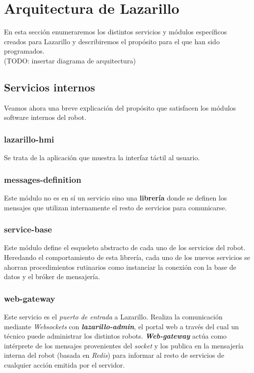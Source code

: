 \section{Arquitectura de Lazarillo}

En esta sección enumeraremos los distintos servicios y módulos específicos creados para Lazarillo y describiremos el propósito para el que han sido programados.\\

(TODO: insertar diagrama de arquitectura)

\subsection{Servicios internos}

Veamos ahora una breve explicación del propósito que satisfacen los módulos software internos del robot.

\subsubsection{lazarillo-hmi}

Se trata de la aplicación que muestra la interfaz táctil al usuario.

\subsubsection{messages-definition}

Este módulo no es en sí un servicio sino una \textbf{librería} donde se definen los mensajes que utilizan internamente el resto de servicios para comunicarse.

\subsubsection{service-base}

Este módulo define el esqueleto abstracto de cada uno de los servicios del robot. Heredando el comportamiento de esta librería, cada uno de los nuevos servicios se ahorran procedimientos rutinarios como instanciar la conexión con la base de datos y el bróker de mensajería.

\subsubsection{web-gateway}

Este servicio es el \textit{puerto de entrada} a Lazarillo. Realiza la comunicación mediante \textit{Websockets} con \textbf{\textit{lazarillo-admin}}, el portal web a través del cual un técnico puede administrar los distintos robots. \textit{\textbf{Web-gateway}} actúa como intérprete de los mensajes provenientes del \textit{socket} y los publica en la mensajería interna del robot (basada en \textit{Redis}) para informar al resto de servicios de cualquier acción emitida por el servidor.


